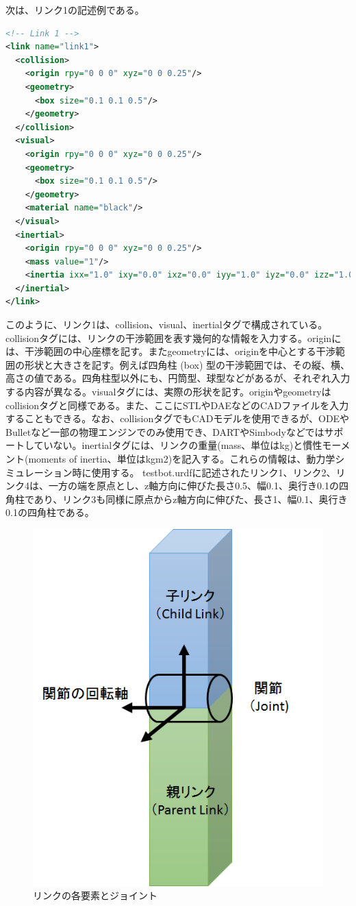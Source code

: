 次は、リンク1の記述例である。

\begin{lstlisting}[language=XML]
<!-- Link 1 -->
<link name="link1">
  <collision>
    <origin rpy="0 0 0" xyz="0 0 0.25"/>
    <geometry>
      <box size="0.1 0.1 0.5"/>
    </geometry>
  </collision>
  <visual>
    <origin rpy="0 0 0" xyz="0 0 0.25"/>
    <geometry>
      <box size="0.1 0.1 0.5"/>
    </geometry>
    <material name="black"/>
  </visual>
  <inertial>
    <origin rpy="0 0 0" xyz="0 0 0.25"/>
    <mass value="1"/>
    <inertia ixx="1.0" ixy="0.0" ixz="0.0" iyy="1.0" iyz="0.0" izz="1.0"/>
  </inertial>
</link>
\end{lstlisting}

このように、リンク1は、collision、visual、inertialタグで構成されている。collisionタグには、リンクの干渉範囲を表す幾何的な情報を入力する。originには、干渉範囲の中心座標を記す。またgeometryには、originを中心とする干渉範囲の形状と大きさを記す。例えば四角柱 (box) 型の干渉範囲では、その縦、横、高さの値である。四角柱型以外にも、円筒型、球型などがあるが、それぞれ入力する内容が異なる。visualタグには、実際の形状を記す。originやgeometryはcollisionタグと同様である。また、ここにSTLやDAEなどのCADファイルを入力することもできる。なお、collisionタグでもCADモデルを使用できるが、ODEやBulletなど一部の物理エンジンでのみ使用でき、DARTやSimbodyなどではサポートしていない。inertialタグには、リンクの重量(mass、単位はkg)と慣性モーメント(moments of inertia、単位はkgm2)を記入する。これらの情報は、動力学シミュレーション時に使用する。
testbot.urdfに記述されたリンク1、リンク2、リンク4は、一方の端を原点とし、z軸方向に伸びた長さ0.5、幅0.1、奥行き0.1の四角柱であり、リンク3も同様に原点からz軸方向に伸びた、長さ1、幅0.1、奥行き0.1の四角柱である。

\begin{figure}[ht]
  \centering
  \includegraphics[width=0.5\columnwidth]{pictures/chapter11/pic_11_04.png}
  \caption{リンクの各要素とジョイント}
\end{figure}

